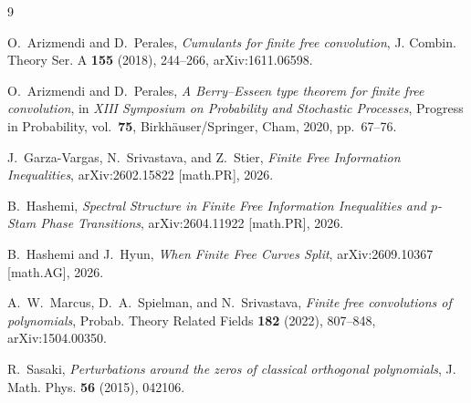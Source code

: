 \documentclass[11pt,a4paper]{article}
\theoremstyle{definition}
\begin{document}
\begin{thebibliography}{9}

O.~Arizmendi and D.~Perales,
\emph{Cumulants for finite free convolution},
J. Combin. Theory Ser. A \textbf{155} (2018), 244--266, arXiv:1611.06598.

O.~Arizmendi and D.~Perales,
\emph{A Berry--Esseen type theorem for finite free convolution},
in \emph{XIII Symposium on Probability and Stochastic Processes},
Progress in Probability, vol.~\textbf{75}, Birkh\"auser/Springer, Cham, 2020, pp.~67--76.

J.~Garza-Vargas, N.~Srivastava, and Z.~Stier,
\emph{Finite Free Information Inequalities},
arXiv:2602.15822 [math.PR], 2026.

B.~Hashemi,
\emph{Spectral Structure in Finite Free Information Inequalities and $p$-Stam Phase Transitions},
arXiv:2604.11922 [math.PR], 2026.

B.~Hashemi and J.~Hyun,
\emph{When Finite Free Curves Split},
arXiv:2609.10367 [math.AG], 2026.

A.~W.~Marcus, D.~A.~Spielman, and N.~Srivastava,
\emph{Finite free convolutions of polynomials},
Probab. Theory Related Fields \textbf{182} (2022), 807--848, arXiv:1504.00350.

R.~Sasaki,
\emph{Perturbations around the zeros of classical orthogonal polynomials},
J. Math. Phys. \textbf{56} (2015), 042106.

\end{thebibliography}
\end{document}
